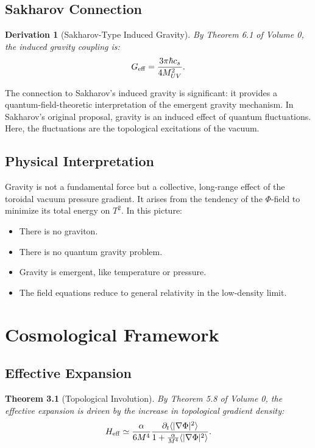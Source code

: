 \documentclass[12pt,oneside]{book}
\newtheorem{theorem}{Theorem}[chapter]
\newtheorem{derivation}{Derivation}[chapter]
\begin{document}
\section{Sakharov Connection}

\begin{derivation}[Sakharov-Type Induced Gravity]
By Theorem 6.1 of Volume 0, the induced gravity coupling is:
\[
G_{\rm eff} = \frac{3\pi \hbar c_s}{4 M_{UV}^2}.
\]
\end{derivation}

The connection to Sakharov's induced gravity is significant: it provides a quantum-field-theoretic interpretation of the emergent gravity mechanism. In Sakharov's original proposal, gravity is an induced effect of quantum fluctuations. Here, the fluctuations are the topological excitations of the vacuum.

\section{Physical Interpretation}

Gravity is not a fundamental force but a collective, long-range effect of the toroidal vacuum pressure gradient. It arises from the tendency of the $\Phi$-field to minimize its total energy on $T^2$. In this picture:
\begin{itemize}
    \item There is no graviton.
    \item There is no quantum gravity problem.
    \item Gravity is emergent, like temperature or pressure.
    \item The field equations reduce to general relativity in the low-density limit.
\end{itemize}

\chapter{Cosmological Framework}

\section{Effective Expansion}

\begin{theorem}[Topological Involution]
By Theorem 5.8 of Volume 0, the effective expansion is driven by the increase in topological gradient density:
\[
H_{\rm eff} \simeq \frac{\alpha}{6M^4} \frac{\partial_t \langle |\nabla\Phi|^2 \rangle}{1 + \frac{\alpha}{M^4}\langle |\nabla\Phi|^2 \rangle}.
\]
\end{theorem}
\end{document}
